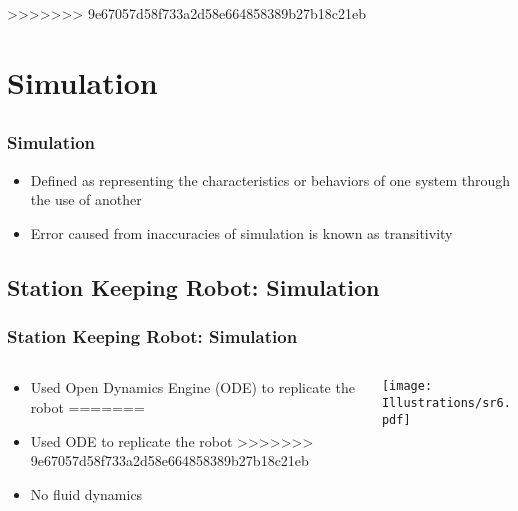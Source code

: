 \documentclass{beamer}
\begin{document}
\begin{frame}
>>>>>>> 9e67057d58f733a2d58e664858389b27b18c21eb
\section{Simulation}

\subsection{}
\begin{frame}
\frametitle{Simulation}
\begin{itemize}
\item Defined as representing the characteristics or behaviors of one system through the use of another
\item Error caused from inaccuracies of simulation is known as transitivity 
\end{itemize}
\end{frame}

\subsection*{Station Keeping Robot: Simulation}
\begin{frame}
  \frametitle{Station Keeping Robot: Simulation}
\begin{columns}
  \begin{column}{0.5\textwidth}
\begin{itemize}
<<<<<<< HEAD
\item  Used Open Dynamics Engine (ODE) to replicate the robot
=======
\item  Used ODE to replicate the robot
>>>>>>> 9e67057d58f733a2d58e664858389b27b18c21eb
\item  No fluid dynamics
\end{itemize}
\end{column}
\begin{column}{0.5\textwidth}
 \texttt{[image: Illustrations/sr6.pdf]}
       \\
\end{column}
\end{columns}
\end{frame}


\end{frame}
\end{document}
